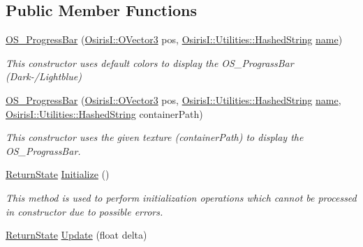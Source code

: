 \subsection*{Public Member Functions}
\begin{DoxyCompactItemize}
\item 
\hyperlink{class_osiris_i_1_1_graphics_1_1_components_1_1_o_s___progress_bar_a476b74b34a32b89771ef3cd29f24fc8f}{O\-S\-\_\-\-Progress\-Bar} (\hyperlink{struct_osiris_i_1_1_o_vector3}{Osiris\-I\-::\-O\-Vector3} pos, \hyperlink{class_osiris_i_1_1_utilities_1_1_hashed_string}{Osiris\-I\-::\-Utilities\-::\-Hashed\-String} \hyperlink{class_osiris_i_1_1_i_osiris_object_a6a3324b9c5ea3afabc9f3ffd9b666db9}{name})
\begin{DoxyCompactList}\small\item\em This constructor uses default colors to display the O\-S\-\_\-\-Prograss\-Bar (Dark-\//\-Lightblue) \end{DoxyCompactList}\item 
\hyperlink{class_osiris_i_1_1_graphics_1_1_components_1_1_o_s___progress_bar_ad47448fc763144a4eef9355ddaac8ed6}{O\-S\-\_\-\-Progress\-Bar} (\hyperlink{struct_osiris_i_1_1_o_vector3}{Osiris\-I\-::\-O\-Vector3} pos, \hyperlink{class_osiris_i_1_1_utilities_1_1_hashed_string}{Osiris\-I\-::\-Utilities\-::\-Hashed\-String} \hyperlink{class_osiris_i_1_1_i_osiris_object_a6a3324b9c5ea3afabc9f3ffd9b666db9}{name}, \hyperlink{class_osiris_i_1_1_utilities_1_1_hashed_string}{Osiris\-I\-::\-Utilities\-::\-Hashed\-String} container\-Path)
\begin{DoxyCompactList}\small\item\em This constructor uses the given texture (container\-Path) to display the O\-S\-\_\-\-Prograss\-Bar. \end{DoxyCompactList}\item 
\hyperlink{namespace_osiris_i_a8f53bf938dc75c65c6a529694514013e}{Return\-State} \hyperlink{class_osiris_i_1_1_graphics_1_1_components_1_1_o_s___progress_bar_af99f9aef486df49db2aa1eb2a2aad05b}{Initialize} ()
\begin{DoxyCompactList}\small\item\em This method is used to perform initialization operations which cannot be processed in constructor due to possible errors. \end{DoxyCompactList}\item 
\hyperlink{namespace_osiris_i_a8f53bf938dc75c65c6a529694514013e}{Return\-State} \hyperlink{class_osiris_i_1_1_graphics_1_1_components_1_1_o_s___progress_bar_ad0c4524fa225e7251eb416c66ae7e03f}{Update} (float delta)

\end{DoxyCompactItemize}
